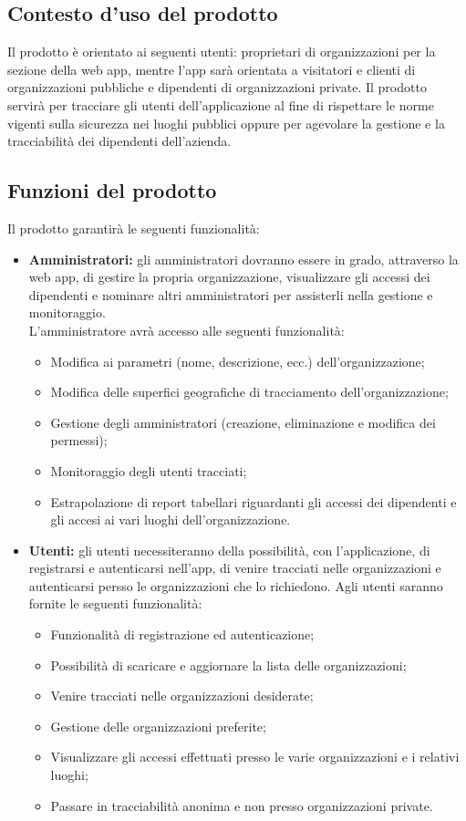 \subsection{Contesto d'uso del prodotto}
Il prodotto è orientato ai seguenti utenti: proprietari di organizzazioni per la sezione della web app, mentre l'app sarà orientata a visitatori e clienti di organizzazioni pubbliche e dipendenti di organizzazioni private.
Il prodotto servirà per tracciare gli utenti dell'applicazione al fine di rispettare le norme vigenti sulla sicurezza nei luoghi pubblici oppure per agevolare la gestione e la tracciabilità dei dipendenti dell'azienda.

\subsection{Funzioni del prodotto}
Il prodotto garantirà le seguenti funzionalità:
\begin{itemize}
    \item \textbf{Amministratori:} gli amministratori dovranno essere in grado, attraverso la web app, di gestire la propria organizzazione, visualizzare gli accessi dei dipendenti e nominare altri amministratori per assisterli nella gestione e monitoraggio. \\
        L'amministratore avrà accesso alle seguenti funzionalità:
        \begin{itemize}
            \item Modifica ai parametri (nome, descrizione, ecc.) dell'organizzazione;
            \item Modifica delle superfici geografiche di tracciamento dell'organizzazione;
            \item Gestione degli amministratori (creazione, eliminazione e modifica dei permessi);
            \item Monitoraggio degli utenti tracciati;
            \item Estrapolazione di report tabellari riguardanti gli accessi dei dipendenti e gli accesi ai vari luoghi dell'organizzazione.
        \end{itemize}
    \item \textbf{Utenti:} gli utenti necessiteranno della possibilità, con l'applicazione, di registrarsi e autenticarsi nell'app, di venire tracciati nelle organizzazioni e autenticarsi persso le organizzazioni che lo richiedono. Agli utenti saranno fornite le seguenti funzionalità:
    \begin{itemize}
        \item Funzionalità di registrazione ed autenticazione;
        \item Possibilità di scaricare e aggiornare la lista delle organizzazioni;
        \item Venire tracciati nelle organizzazioni desiderate;
        \item Gestione delle organizzazioni preferite;
        \item Visualizzare gli accessi effettuati presso le varie organizzazioni e i relativi luoghi;
        \item Passare in tracciabilità anonima e non presso organizzazioni private.
    \end{itemize}
\end{itemize}
